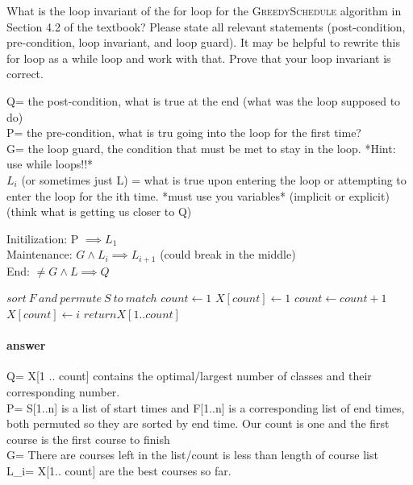 \documentclass{article}
\begin{document}
\todo{}

\collab{}

What is the loop invariant of the for loop for the \textsc{GreedySchedule}
algorithm in Section 4.2 of the textbook?  Please state all relevant statements
(post-condition, pre-condition, loop invariant, and loop guard).  It may be
helpful to rewrite this for loop as a while loop and work with that.  Prove that
your loop invariant is correct.

Q= the post-condition, what is true at the end (what was the loop supposed to do) \\
P= the pre-condition, what is tru going into the loop for the first time? \\
G= the loop guard, the condition that must be met to stay in the loop. *Hint: use while loops!!* \\
$L_{i}$ (or sometimes just L) = what is true upon entering the loop or attempting to enter the loop for the ith time. *must use you variables* (implicit or explicit) (think what is getting us closer to Q)

Initilization: P $\implies L_{1}$ \\
Maintenance: $G \wedge L_{i} \implies L_{i+1}$ (could break in the middle) \\
End: $\neq G \wedge L \implies Q$

\begin{algorithmic}[1]
    \State$ sort\ F\ and\ permute\ S\ to\ match$
    \State$ count \gets 1$
    \State$ X [count] \gets 1$
            \State$ count \gets count + 1$
            \State$ X [count] \gets i$
        \EndIf{}
    \EndFor{}
    \State$ return X [1 .. count]$
\end{algorithmic}

\paragraph{answer}

Q= X[1 .. count] contains the optimal/largest number of classes and their corresponding number.\\
P= S[1..n] is a list of start times and F[1..n] is a corresponding list of end times, both permuted
so they are sorted by end time. Our count is one and the first course is the first course to finish\\
G= There are courses left in the list/count is less than length of course list\\
L_{i}= X[1.. count] are the best courses so far.
\end{document}

